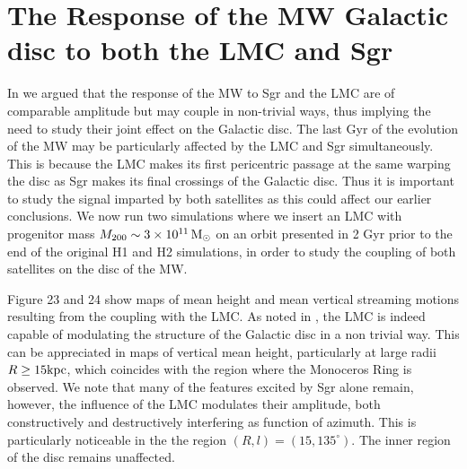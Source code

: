 \documentclass[useAMS,usenatbib]{mnras}
\begin{document}
\section{The Response of the MW Galactic disc to both the LMC and Sgr}

In \cite{laporte16} we argued that the response of the MW to Sgr and the LMC are of comparable amplitude but may couple in non-trivial ways, thus implying the need to study their joint effect on the Galactic disc. The last Gyr of the evolution of the MW may be particularly affected by the LMC and Sgr simultaneously. This is because the LMC makes its first pericentric passage at the same warping the disc \citep{weinberg06, laporte16} as Sgr makes its final crossings of the Galactic disc. Thus it is important to study the signal imparted by both satellites as this could affect our earlier conclusions. We now run two simulations where we insert an LMC with progenitor mass $M_{200}\sim3\times10^{11}\,\rm{M_{\odot}}$ on an orbit presented in \cite{laporte16} 2 Gyr prior to the end of the original H1 and H2 simulations, in order to study the coupling of both satellites on the disc of the MW.

Figure 23 and 24 show maps of mean height and mean vertical streaming motions resulting from the coupling with the LMC. As noted in \cite{laporte16}, the LMC is indeed capable of modulating the structure of the Galactic disc in a non trivial way. This can be appreciated in maps of vertical mean height, particularly at large radii $R\geq 15 \rm{kpc}$, which coincides with the region where the Monoceros Ring is observed. We note that many of the features excited by Sgr alone remain, however, the influence of the LMC modulates their amplitude, both constructively and destructively interfering as function of azimuth. This is particularly noticeable in the the region $(R,l)=(15,135^{\circ})$. The inner region of the disc remains unaffected. %
\end{document}
